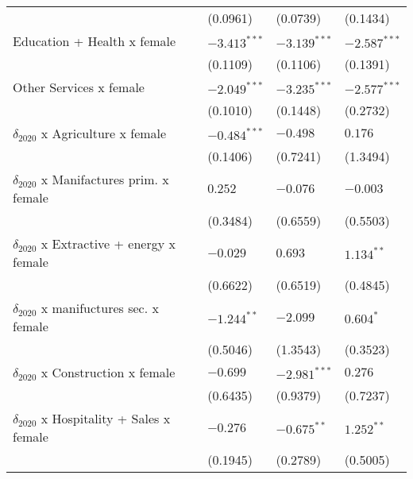 \begin{tabular}{llll}
                                                   &           (0.0961) &           (0.0739) &           (0.1434) \\
Education + Health x female                        &     $-3.413^{***}$ &     $-3.139^{***}$ &     $-2.587^{***}$ \\
                                                   &           (0.1109) &           (0.1106) &           (0.1391) \\
Other Services x female                            &     $-2.049^{***}$ &     $-3.235^{***}$ &     $-2.577^{***}$ \\
                                                   &           (0.1010) &           (0.1448) &           (0.2732) \\
$\delta_{2020}$ x Agriculture x female             &     $-0.484^{***}$ &           $-0.498$ &            $0.176$ \\
                                                   &           (0.1406) &           (0.7241) &           (1.3494) \\
$\delta_{2020}$ x Manifactures prim. x female      &            $0.252$ &           $-0.076$ &           $-0.003$ \\
                                                   &           (0.3484) &           (0.6559) &           (0.5503) \\
$\delta_{2020}$ x Extractive + energy x female     &           $-0.029$ &            $0.693$ &       $1.134^{**}$ \\
                                                   &           (0.6622) &           (0.6519) &           (0.4845) \\
$\delta_{2020}$ x manifuctures sec. x female       &      $-1.244^{**}$ &           $-2.099$ &          $0.604^*$ \\
                                                   &           (0.5046) &           (1.3543) &           (0.3523) \\
$\delta_{2020}$ x Construction x female            &           $-0.699$ &     $-2.981^{***}$ &            $0.276$ \\
                                                   &           (0.6435) &           (0.9379) &           (0.7237) \\
$\delta_{2020}$ x Hospitality + Sales x female     &           $-0.276$ &      $-0.675^{**}$ &       $1.252^{**}$ \\
                                                   &           (0.1945) &           (0.2789) &           (0.5005) \\

\end{tabular}
